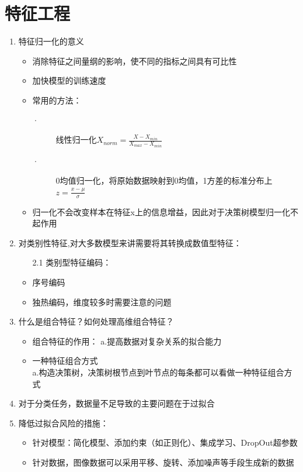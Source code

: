 \documentclass[UTF8]{article}%
\begin{document}
	\section{特征工程}
	\begin{enumerate}
	\item 特征归一化的意义
	\begin{itemize}
	对数值型特征而言：
		\item 消除特征之间量纲的影响，使不同的指标之间具有可比性
		\item 加快模型的训练速度
		\item 常用的方法：
		\begin{description}
			\item [·]线性归一化$X_{norm}=\frac{X-X_{min}}{X_{max}-X_{min}}$
			\item [·]0均值归一化，将原始数据映射到0均值，1方差的标准分布上$z=\frac{x-\mu}{\sigma}$
		\end{description}
		\item 归一化不会改变样本在特征x上的信息增益，因此对于决策树模型归一化不起作用
	\end{itemize}
	\item 对类别性特征,对大多数模型来讲需要将其转换成数值型特征：
	\begin{itemize}
		\item [2.1] 类别型特征编码：
		\item 序号编码
		\item 独热编码，维度较多时需要注意的问题
	\end{itemize}

	\item 什么是组合特征？如何处理高维组合特征？
	\begin{itemize}
		\item 组合特征的作用：
			a.提高数据对复杂关系的拟合能力\\
		\item 一种特征组合方式\\
			a.构造决策树，决策树根节点到叶节点的每条都可以看做一种特征组合方式
	\end{itemize}
	\item 对于分类任务，数据量不足导致的主要问题在于过拟合
	\item 降低过拟合风险的措施：
		\begin{itemize}
			\item 针对模型：简化模型、添加约束（如正则化）、集成学习、DropOut超参数
			\item 针对数据，图像数据可以采用平移、旋转、添加噪声等手段生成新的数据
		\end{itemize}
	\end{enumerate}
	\newpage
\end{document}
